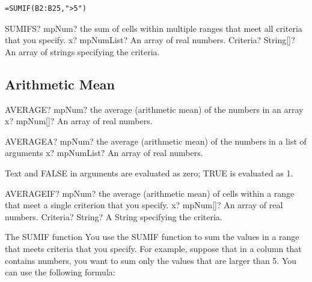 \begin{verbatim}
=SUMIF(B2:B25,">5")
\end{verbatim}


\vspace{0.3cm}
\begin{mpFunctionsExtract}
	\mpWorksheetFunctionTwoNotImplemented
	{SUMIFS? mpNum? the sum of cells within multiple ranges that meet all criteria that you specify.}
	{x? mpNumList? An array of real numbers.}
	{Criteria? String[]? An array of strings specifying the criteria.}
\end{mpFunctionsExtract}






\subsection{Arithmetic Mean}

\begin{mpFunctionsExtract}
	\mpWorksheetFunctionOneNotImplemented
	{AVERAGE? mpNum? the average (arithmetic mean) of the numbers in an array}
	{x? mpNum[]? An array of real numbers.}
\end{mpFunctionsExtract}


\vspace{0.6cm}
\begin{mpFunctionsExtract}
	\mpWorksheetFunctionOneNotImplemented
	{AVERAGEA? mpNum? the average (arithmetic mean) of the numbers in a list of arguments}
	{x? mpNumList? An array of real numbers.}
\end{mpFunctionsExtract}

\vspace{0.3cm}
Text and FALSE in arguments are evaluated as zero; TRUE is evaluated as 1.


\vspace{0.6cm}
\begin{mpFunctionsExtract}
	\mpWorksheetFunctionTwoNotImplemented
	{AVERAGEIF? mpNum? the average (arithmetic mean) of cells within a range that meet a single criterion that you specify.}
	{x? mpNum[]? An array of real numbers.}
	{Criteria? String? A String specifying the criteria.}
\end{mpFunctionsExtract}

\vspace{0.3cm}
The \textsf{SUMIF} function   You use the SUMIF function to sum the values in a range  that meets criteria that you specify. For example, suppose that in a column that contains numbers, you want to sum only the values that are larger than 5. You can use the following formula:

